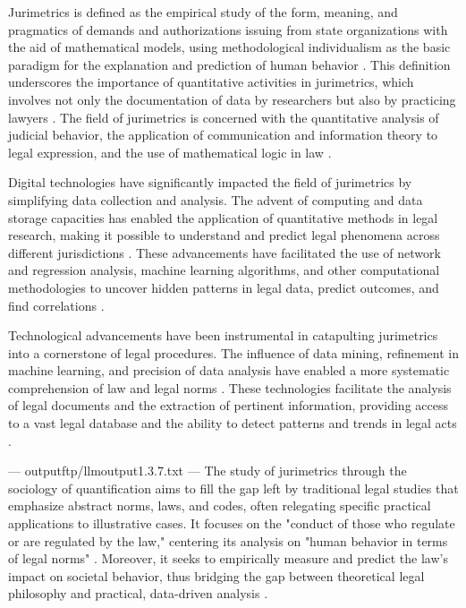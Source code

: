 Jurimetrics is defined as the empirical study of the form, meaning, and pragmatics of demands and authorizations issuing from state organizations with the aid of mathematical models, using methodological individualism as the basic paradigm for the explanation and prediction of human behavior \cite{101111lsi12334}. This definition underscores the importance of quantitative activities in jurimetrics, which involves not only the documentation of data by researchers but also by practicing lawyers \cite{l2010de}. The field of jurimetrics is concerned with the quantitative analysis of judicial behavior, the application of communication and information theory to legal expression, and the use of mathematical logic in law \cite{1023071190721}.

Digital technologies have significantly impacted the field of jurimetrics by simplifying data collection and analysis. The advent of computing and data storage capacities has enabled the application of quantitative methods in legal research, making it possible to understand and predict legal phenomena across different jurisdictions \cite{10.1007/s11186-021-09453-1,unger2021process}. These advancements have facilitated the use of network and regression analysis, machine learning algorithms, and other computational methodologies to uncover hidden patterns in legal data, predict outcomes, and find correlations \cite{10.1007/s11186-021-09453-1,unger2021process}.

Technological advancements have been instrumental in catapulting jurimetrics into a cornerstone of legal procedures. The influence of data mining, refinement in machine learning, and precision of data analysis have enabled a more systematic comprehension of law and legal norms \cite{10.1007/s11186-021-09453-1,unger2021process}. These technologies facilitate the analysis of legal documents and the extraction of pertinent information, providing access to a vast legal database and the ability to detect patterns and trends in legal acts \cite{10.1007/s11186-021-09453-1,unger2021process}.


---
outputftp/llmoutput1.3.7.txt
---
The study of jurimetrics through the sociology of quantification aims to fill the gap left by traditional legal studies that emphasize abstract norms, laws, and codes, often relegating specific practical applications to illustrative cases. It focuses on the "conduct of those who regulate or are regulated by the law," centering its analysis on "human behavior in terms of legal norms" \cite{nunes2018}. Moreover, it seeks to empirically measure and predict the law's impact on societal behavior, thus bridging the gap between theoretical legal philosophy and practical, data-driven analysis \cite{de2010, demortain2019, nunes2018}.

